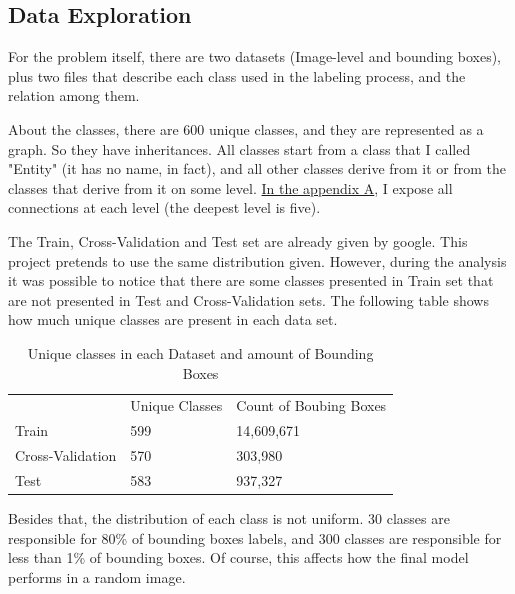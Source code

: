 \documentclass[11pt, a4paper, onecolumn]{article}
\begin{document}
\subsection{Data Exploration}

For the problem itself, there are two datasets (Image-level and bounding boxes), plus two files that describe each class used in the labeling process, and the relation among them.

About the classes, there are 600 unique classes, and they are represented as a graph. So they have inheritances. All classes start from a class that I called "Entity" (it has no name, in fact), and all other classes derive from it or from the classes that derive from it on some level. \hyperref[sec:appendix-a]{In the appendix A}, I expose all connections at each level (the deepest level is five).

The Train, Cross-Validation and Test set are already given by google. This project pretends to use the same distribution given. However, during the analysis it was possible to notice that there are some classes presented in Train set that are not presented in Test and Cross-Validation sets. The following table shows how much unique classes are present in each data set.

\begin{table}[ht]
	\footnotesize
	\centering
	\caption{ \footnotesize Unique classes in each Dataset and amount of Bounding Boxes }
	\label{table1}
	\begin{tabular}{lll}
		& Unique Classes & Count of Boubing Boxes \\
		\rowcolor[HTML]{EFEFEF} 
		Train            & 599            & 14,609,671             \\
		Cross-Validation & 570            & 303,980                \\
		\rowcolor[HTML]{EFEFEF} 
		Test             & 583            & 937,327               
	\end{tabular}
\end{table}

Besides that, the distribution of each class is not uniform. 30 classes are responsible for 80\% of bounding boxes labels, and 300 classes are responsible for less than 1\% of bounding boxes. Of course, this affects how the final model performs in a random image.
\end{document}
